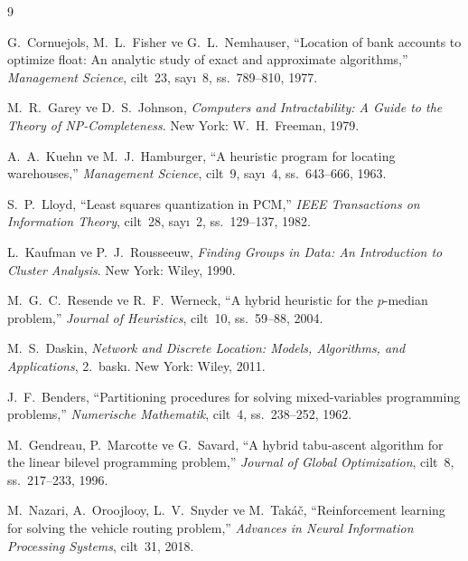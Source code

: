 \documentclass[conference]{IEEEtran}
\begin{document}

\begin{thebibliography}{9}

G.~Cornuejols, M.~L.~Fisher ve G.~L.~Nemhauser,
``Location of bank accounts to optimize float: An analytic study of exact
and approximate algorithms,''
\textit{Management Science}, cilt~23, say{\i}~8, ss.~789--810, 1977.

M.~R.~Garey ve D.~S.~Johnson,
\textit{Computers and Intractability: A Guide to the Theory of
NP-Completeness}.
New York: W.~H.~Freeman, 1979.

A.~A.~Kuehn ve M.~J.~Hamburger,
``A heuristic program for locating warehouses,''
\textit{Management Science}, cilt~9, say{\i}~4, ss.~643--666, 1963.

S.~P.~Lloyd,
``Least squares quantization in PCM,''
\textit{IEEE Transactions on Information Theory}, cilt~28, say{\i}~2,
ss.~129--137, 1982.

L.~Kaufman ve P.~J.~Rousseeuw,
\textit{Finding Groups in Data: An Introduction to Cluster Analysis}.
New York: Wiley, 1990.

M.~G.~C.~Resende ve R.~F.~Werneck,
``A hybrid heuristic for the $p$-median problem,''
\textit{Journal of Heuristics}, cilt~10, ss.~59--88, 2004.

M.~S.~Daskin,
\textit{Network and Discrete Location: Models, Algorithms, and
Applications}, 2.~bask{\i}. New York: Wiley, 2011.

J.~F.~Benders,
``Partitioning procedures for solving mixed-variables programming
problems,''
\textit{Numerische Mathematik}, cilt~4, ss.~238--252, 1962.

M.~Gendreau, P.~Marcotte ve G.~Savard,
``A hybrid tabu-ascent algorithm for the linear bilevel programming
problem,''
\textit{Journal of Global Optimization}, cilt~8, ss.~217--233, 1996.

M.~Nazari, A.~Oroojlooy, L.~V.~Snyder ve M.~Tak\'{a}\v{c},
``Reinforcement learning for solving the vehicle routing problem,''
\textit{Advances in Neural Information Processing Systems}, cilt~31,
2018.

\end{thebibliography}
\end{document}
